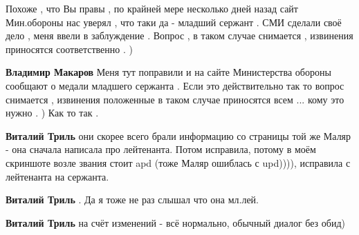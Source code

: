 \begin{itemize}
\begin{itemize}
 

Похоже , что Вы правы , по крайней мере несколько дней назад сайт Мин.обороны
нас уверял , что таки да - младший сержант . СМИ сделали своё дело , меня ввели
в заблуждение . Вопрос , в таком случае снимается , извинения приносятся
соответственно . )


 
\textbf{Владимир Макаров} Меня тут поправили и на сайте Министерства обороны
сообщают о медали младшего сержанта . Если это действительно так то вопрос
снимается , извинения положенные в таком случае приносятся всем ... кому это
нужно . ) Как то так .

 
\textbf{Виталий Триль} они скорее всего брали информацию со страницы той же
Маляр - она сначала написала про лейтенанта. Потом исправила, потому в моём
скриншоте возле звания стоит apd (тоже Маляр ошиблась с upd)))), исправила с
лейтенанта на сержанта.

 
\textbf{Виталий Триль} . Да я тоже не раз слышал что она мл.лей.

 
\textbf{Виталий Триль} на счёт изменений - всё нормально, обычный диалог без обид)


\end{itemize}
\end{itemize}
